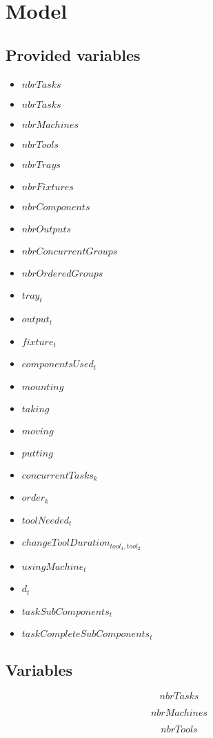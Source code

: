 \documentclass[10pt,a4paper]{report}
\begin{document}
\section*{Model}
\subsection*{Provided variables}
\begin{itemize}
\item $nbrTasks$
\item $nbrTasks$
\item $nbrMachines$
\item $nbrTools$
\item $nbrTrays$
\item $nbrFixtures$
\item $nbrComponents$
\item $nbrOutputs$
\item $nbrConcurrentGroups$
\item $nbrOrderedGroups$
\item $tray_t$
\item $output_t$
\item $fixture_t$
\item $componentsUsed_t$
\item $mounting$
\item $taking$
\item $moving$
\item $putting$
\item $concurrentTasks_k$
\item $order_k$
\item $toolNeeded_t$
\item $changeToolDuration_{tool_1,tool_2}$
\item $usingMachine_t$
\item $d_t$
\item $taskSubComponents_t$
\item $taskCompleteSubComponents_t$
\end{itemize}


\subsection*{Variables}

$$nbrTasks$$

$$nbrMachines$$

$$nbrTools$$
\end{document}
